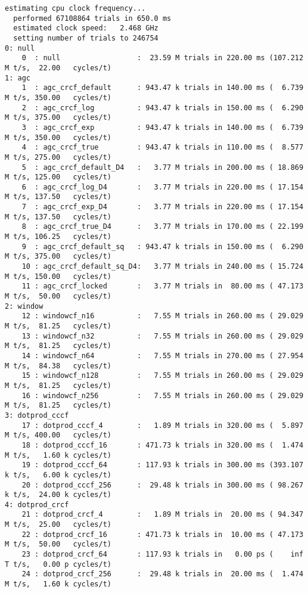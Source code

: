 \begin{Verbatim}[fontsize=\footnotesize]
  estimating cpu clock frequency...
  performed 67108864 trials in 650.0 ms
  estimated clock speed:   2.468 GHz
  setting number of trials to 246754
0: null
    0  : null                  :  23.59 M trials in 220.00 ms (107.212 M t/s,  22.00   cycles/t)
1: agc
    1  : agc_crcf_default      : 943.47 k trials in 140.00 ms (  6.739 M t/s, 350.00   cycles/t)
    2  : agc_crcf_log          : 943.47 k trials in 150.00 ms (  6.290 M t/s, 375.00   cycles/t)
    3  : agc_crcf_exp          : 943.47 k trials in 140.00 ms (  6.739 M t/s, 350.00   cycles/t)
    4  : agc_crcf_true         : 943.47 k trials in 110.00 ms (  8.577 M t/s, 275.00   cycles/t)
    5  : agc_crcf_default_D4   :   3.77 M trials in 200.00 ms ( 18.869 M t/s, 125.00   cycles/t)
    6  : agc_crcf_log_D4       :   3.77 M trials in 220.00 ms ( 17.154 M t/s, 137.50   cycles/t)
    7  : agc_crcf_exp_D4       :   3.77 M trials in 220.00 ms ( 17.154 M t/s, 137.50   cycles/t)
    8  : agc_crcf_true_D4      :   3.77 M trials in 170.00 ms ( 22.199 M t/s, 106.25   cycles/t)
    9  : agc_crcf_default_sq   : 943.47 k trials in 150.00 ms (  6.290 M t/s, 375.00   cycles/t)
    10 : agc_crcf_default_sq_D4:   3.77 M trials in 240.00 ms ( 15.724 M t/s, 150.00   cycles/t)
    11 : agc_crcf_locked       :   3.77 M trials in  80.00 ms ( 47.173 M t/s,  50.00   cycles/t)
2: window
    12 : windowcf_n16          :   7.55 M trials in 260.00 ms ( 29.029 M t/s,  81.25   cycles/t)
    13 : windowcf_n32          :   7.55 M trials in 260.00 ms ( 29.029 M t/s,  81.25   cycles/t)
    14 : windowcf_n64          :   7.55 M trials in 270.00 ms ( 27.954 M t/s,  84.38   cycles/t)
    15 : windowcf_n128         :   7.55 M trials in 260.00 ms ( 29.029 M t/s,  81.25   cycles/t)
    16 : windowcf_n256         :   7.55 M trials in 260.00 ms ( 29.029 M t/s,  81.25   cycles/t)
3: dotprod_cccf
    17 : dotprod_cccf_4        :   1.89 M trials in 320.00 ms (  5.897 M t/s, 400.00   cycles/t)
    18 : dotprod_cccf_16       : 471.73 k trials in 320.00 ms (  1.474 M t/s,   1.60 k cycles/t)
    19 : dotprod_cccf_64       : 117.93 k trials in 300.00 ms (393.107 k t/s,   6.00 k cycles/t)
    20 : dotprod_cccf_256      :  29.48 k trials in 300.00 ms ( 98.267 k t/s,  24.00 k cycles/t)
4: dotprod_crcf
    21 : dotprod_crcf_4        :   1.89 M trials in  20.00 ms ( 94.347 M t/s,  25.00   cycles/t)
    22 : dotprod_crcf_16       : 471.73 k trials in  10.00 ms ( 47.173 M t/s,  50.00   cycles/t)
    23 : dotprod_crcf_64       : 117.93 k trials in   0.00 ps (    inf T t/s,   0.00 p cycles/t)
    24 : dotprod_crcf_256      :  29.48 k trials in  20.00 ms (  1.474 M t/s,   1.60 k cycles/t)
\end{Verbatim}
